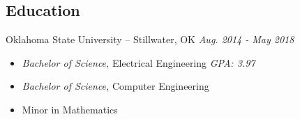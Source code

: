 \documentclass[line,overlapped]{res}
\begin{document}
\begin{resume}
%
  \section{Education} Oklahoma State University -- Stillwater, OK \hfill {\sl Aug. 2014 - May 2018}
  \begin{itemize}
    \setlength\itemsep{.1em}
    \item[]{\sl Bachelor of Science,} Electrical Engineering \hfill {\sl GPA: 3.97}
    \item[]{\sl Bachelor of Science,} Computer Engineering
    \item[] Minor in Mathematics
  \end{itemize}


\end{resume}
\end{document}
